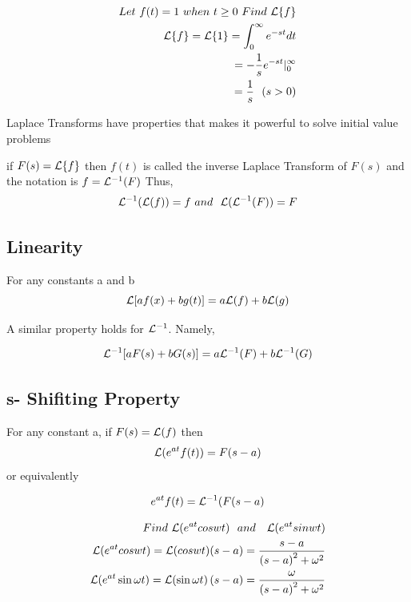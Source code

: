 \documentclass[11pt]{article}
\theoremstyle{definition}
\begin{document}
\begin{equation} 
\begin{split} 
    Let \ f(t) = 1 \ when  \ t  \geq	0 \ Find \ \mathcal{L}\{f\} \\
    \mathcal{L} \{f\} = \mathcal{L}\{1\} = \int _0^\infty e^{-st}dt  \\
    = - \frac{1}{s} e^{-st} | ^{\infty}_{0} \\
    = \frac{1}{s}  \ \ (s  > 0)
  \end{split} 
\end{equation}
\begin{remark}[Laplace]
         Laplace Transforms have properties that makes it powerful to solve initial 
            value problems 
\end{remark}   
\begin{remark}[Laplace]
    if $F(s) = \mathcal{L}\{f\}$ then $f(t)$ is called the inverse Laplace Transform of $F(s)$ and the notation is $f = \mathcal{L}^{-1}(F)$
    Thus, 
 \begin{equation}
     \mathcal{L}^{-1}(\mathcal{L}(f)) = f  \ and \   \  \mathcal{L}(\mathcal{L}^{-1}(F)) = F
 \end{equation}    

 \subsection{Linearity}
For any constants a and b 
\begin{equation}
    \mathcal{L}[af(x) + bg(t)] = a\mathcal{L}(f) + b\mathcal{L}(g)
\end{equation}    

A similar property holds for $\mathcal{L}^{-1}$. Namely,

\begin{equation}
    \mathcal{L}^{-1}[aF(s) + bG(s)] = a\mathcal{L}^{-1}(F) + b \mathcal{L}^{-1}(G)
\end{equation}

\subsection{s- Shifiting Property}

For any constant a, if $F(s) = \mathcal{L}(f)$ then 
\begin{equation}
    \bb(e^{at} f(t)) = F(s - a) 

\end{equation}    
or equivalently

\begin{equation}
    e^{at} f(t) = \mathcal{L}^{-1}(F(s - a)
\end{equation}
\begin{shaded}
\begin{equation}
    \begin{split}
    Find \ \mathcal{L}(e^{at} cos wt) \ \ and \ \ \  \mathcal{L}(e^{at} sin wt ) \\ 
    \mathcal{L}(e^{at} cos wt) = \mathcal{L}(cos wt)( s - a ) = 
    \frac{s - a}{\left( s - a\right)^2 + \omega^2} \\
    \mathcal{L}(e^{at} \sin \omega t ) = \mathcal{L}(\sin \omega t )\left( s - a  \right) 
    = \frac{\omega}{\left( s - a  \right)^2 + \omega^2 }
\end{split}
\end{equation}    
\end{shaded}

\end{remark}
\end{document}
